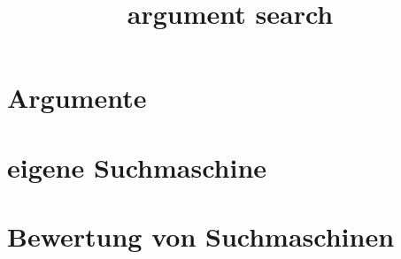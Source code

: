 \documentclass{beamer}
\title{argument search}
\begin{document}
	\begin{frame}
		\tableofcontents
	\end{frame}

	\section{Argumente}
	\begin{frame}
	\end{frame}
	\section{eigene Suchmaschine}
	\begin{frame}
	\end{frame}
	\section{Bewertung von Suchmaschinen}
	\begin{frame}
	\end{frame}
\end{document}
